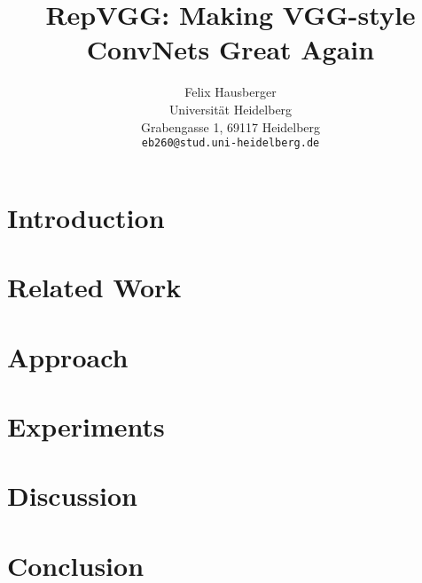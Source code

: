 \documentclass[final]{cvpr}
\begin{document}
\title{RepVGG: Making VGG-style ConvNets Great Again}

\author{Felix Hausberger\\
	Universität Heidelberg\\
	Grabengasse 1, 69117 Heidelberg\\
	{\tt\small eb260@stud.uni-heidelberg.de}
}

\maketitle

\begin{abstract}
	
\end{abstract}

\section{Introduction}


\section{Related Work}


\section{Approach}


\section{Experiments}


\section{Discussion}


\section{Conclusion}


{\small


}
\end{document}
